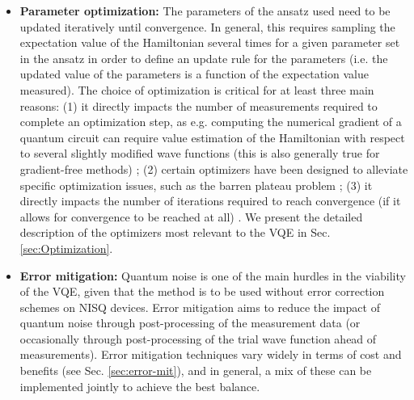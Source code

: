 \begin{itemize}
    \item \textbf{Parameter optimization:} The parameters of the ansatz used need to be updated iteratively until convergence. In general, this requires sampling the expectation value of the Hamiltonian several times for a given parameter set in the ansatz in order to define an update rule for the parameters (i.e. the updated value of the parameters is a function of the expectation value measured). The choice of optimization is critical for at least three main reasons: (1) it directly impacts the number of measurements required to complete an optimization step, as e.g. computing the numerical gradient of a quantum circuit can require value estimation of the Hamiltonian with respect to several slightly modified wave functions (this is also generally true for gradient-free methods) \cite{crooks_gradients_2019, izmaylov_analytic_2021}; (2) certain optimizers have been designed to alleviate specific optimization issues, such as the barren plateau problem \cite{haug_capacity_2021,haug_optimal_2021, nakanishi_sequential_2020,ostaszewskiStructureOptimizationParameterized2021,koczor_quantum_2020}; (3) it directly impacts the number of iterations required to reach convergence (if it allows for convergence to be reached at all) \cite{nakanishi_sequential_2020,ostaszewskiStructureOptimizationParameterized2021,koczor_quantum_2020}. We present the detailed description of the optimizers most relevant to the VQE in Sec. \ref{sec:Optimization}. 
    \item \textbf{Error mitigation:} Quantum noise is one of the main hurdles in the viability of the VQE, given that the method is to be used without error correction schemes on NISQ devices. Error mitigation aims to reduce the impact of quantum noise through post-processing of the measurement data (or occasionally through post-processing of the trial wave function ahead of measurements). Error mitigation techniques vary widely in terms of cost and benefits (see Sec. \ref{sec:error-mit}), and in general, a mix of these can be implemented jointly to achieve the best balance.
\end{itemize}

